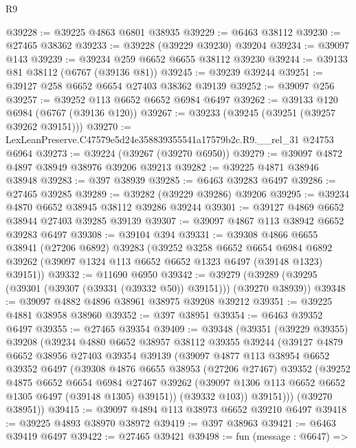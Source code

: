 \begin{lexlean}{R9}
\begin{coremodule}
@39228 := @39225 @4863 @6801 @38935
@39229 := @6463 @38112
@39230 := @27465 @38362
@39233 := @39228 (@39229 @39230) @39204
@39234 := @39097 @143
@39239 := @39234 @259 @6652 @6655 @38112 @39230
@39244 := @39133 @81 @38112 (@6767 (@39136 @81))
@39245 := @39239 @39244
@39251 := @39127 @258 @6652 @6654 @27403 @38362 @39139
@39252 := @39097 @256
@39257 := @39252 @113 @6652 @6652 @6984 @6497
@39262 := @39133 @120 @6984 (@6767 (@39136 @120))
@39267 := @39233 (@39245 (@39251 (@39257 @39262 @39151)))
@39270 := LexLeanPreserve.C47579e5d24e358839355541a17579b2c.R9.__rel_31 @24753 @6964
@39273 := @39224 (@39267 (@39270 @6950))
@39279 := @39097 @4872 @4897 @38949 @38976 @39206 @39213
@39282 := @39225 @4871 @38946 @38948
@39283 := @397 @38939
@39285 := @6463 @39283 @6497
@39286 := @27465 @39285
@39289 := @39282 (@39229 @39286) @39206
@39295 := @39234 @4870 @6652 @38945 @38112 @39286 @39244
@39301 := @39127 @4869 @6652 @38944 @27403 @39285 @39139
@39307 := @39097 @4867 @113 @38942 @6652 @39283 @6497
@39308 := @39104 @394
@39331 := @39308
    @4866
    @6655
    @38941
    (@27206 @6892)
    @39283
    (@39252
      @3258
      @6652
      @6654
      @6984
      @6892
      @39262
      (@39097 @1324 @113 @6652 @6652 @1323 @6497 (@39148 @1323) @39151))
@39332 := @11690 @6950
@39342 := @39279 (@39289 (@39295 (@39301 (@39307 (@39331 (@39332 @50)) @39151))) (@39270 @38939))
@39348 := @39097 @4882 @4896 @38961 @38975 @39208 @39212
@39351 := @39225 @4881 @38958 @38960
@39352 := @397 @38951
@39354 := @6463 @39352 @6497
@39355 := @27465 @39354
@39409 := @39348
    (@39351
      (@39229 @39355)
      @39208
      (@39234
        @4880
        @6652
        @38957
        @38112
        @39355
        @39244
        (@39127
          @4879
          @6652
          @38956
          @27403
          @39354
          @39139
          (@39097
            @4877
            @113
            @38954
            @6652
            @39352
            @6497
            (@39308
              @4876
              @6655
              @38953
              (@27206 @27467)
              @39352
              (@39252
                @4875
                @6652
                @6654
                @6984
                @27467
                @39262
                (@39097 @1306 @113 @6652 @6652 @1305 @6497 (@39148 @1305) @39151))
              (@39332 @103))
            @39151)))
      (@39270 @38951))
@39415 := @39097 @4894 @113 @38973 @6652 @39210 @6497
@39418 := @39225 @4893 @38970 @38972
@39419 := @397 @38963
@39421 := @6463 @39419 @6497
@39422 := @27465 @39421
@39498 := fun (message : @6647) =>

\end{coremodule}
\end{lexlean}
